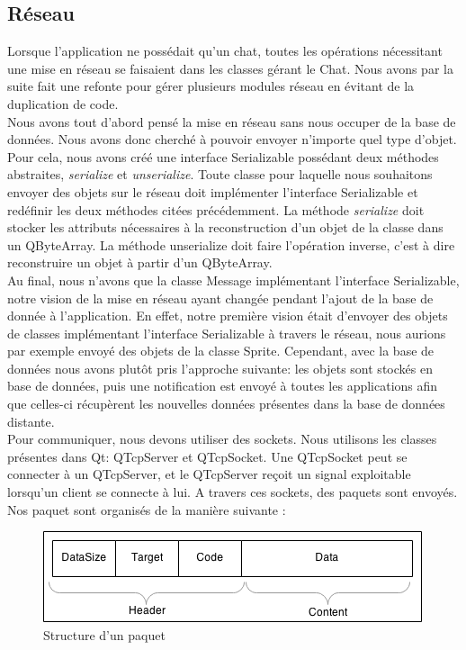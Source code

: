 \subsection{Réseau}


Lorsque l'application ne possédait qu'un chat, toutes les opérations nécessitant une mise en réseau se faisaient dans les classes gérant le Chat. Nous avons par la suite fait une refonte pour gérer plusieurs modules réseau en évitant de la duplication de code.\\

Nous avons tout d'abord pensé la mise en réseau sans nous occuper de la base de données. Nous avons donc cherché à pouvoir envoyer n'importe quel type d'objet. Pour cela, nous avons créé une interface Serializable possédant deux méthodes abstraites, \emph{serialize} et \emph{unserialize}. Toute classe pour laquelle nous souhaitons envoyer des objets sur le réseau doit implémenter l'interface Serializable et redéfinir les deux méthodes citées précédemment. La méthode \emph{serialize} doit stocker les attributs nécessaires à la reconstruction d'un objet de la classe dans un QByteArray. La méthode unserialize doit faire l'opération inverse, c'est à dire reconstruire un objet à partir d'un QByteArray.\\
Au final, nous n'avons que la classe Message implémentant l'interface Serializable, notre vision de la mise en réseau ayant changée pendant l'ajout de la base de donnée à l'application. En effet, notre première vision était d'envoyer des objets de classes implémentant l'interface Serializable à travers le réseau, nous aurions par exemple envoyé des objets de la classe Sprite. Cependant, avec la base de données nous avons plutôt pris l'approche suivante: les objets sont stockés en base de données, puis une notification est envoyé à toutes les applications afin que celles-ci récupèrent les nouvelles données présentes dans la base de données distante.\\

Pour communiquer, nous devons utiliser des sockets. Nous utilisons les classes présentes dans Qt: QTcpServer et QTcpSocket. Une QTcpSocket peut se connecter à un QTcpServer, et le QTcpServer reçoit un signal exploitable lorsqu'un client se connecte à lui. A travers ces sockets, des paquets sont envoyés. Nos paquet sont organisés de la manière suivante :\\

\begin{figure}[h!]
	\centering
	\includegraphics[scale=0.6]{img/network_packet.png}
	\caption{Structure d'un paquet}
\end{figure}


